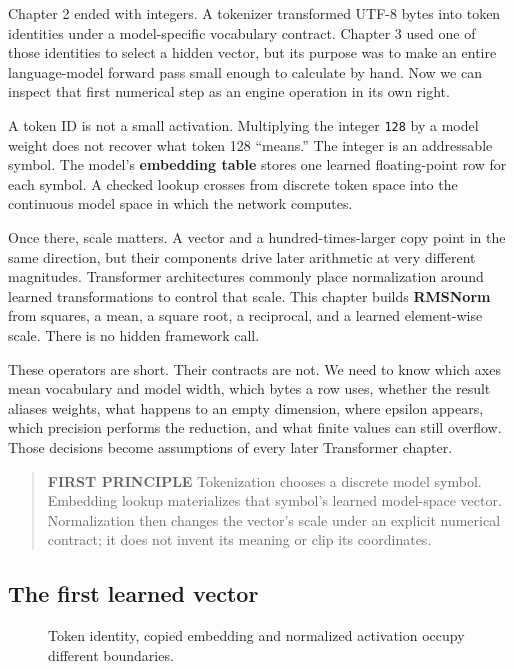 \documentclass[
  10pt,
]{article}
\begin{document}
Chapter 2 ended with integers. A tokenizer transformed UTF-8 bytes into
token identities under a model-specific vocabulary contract. Chapter 3
used one of those identities to select a hidden vector, but its purpose
was to make an entire language-model forward pass small enough to
calculate by hand. Now we can inspect that first numerical step as an
engine operation in its own right.

A token ID is not a small activation. Multiplying the integer
\texttt{128} by a model weight does not recover what token 128
``means.'' The integer is an addressable symbol. The model's
\textbf{embedding table} stores one learned floating-point row for each
symbol. A checked lookup crosses from discrete token space into the
continuous model space in which the network computes.

Once there, scale matters. A vector and a hundred-times-larger copy
point in the same direction, but their components drive later arithmetic
at very different magnitudes. Transformer architectures commonly place
normalization around learned transformations to control that scale. This
chapter builds \textbf{RMSNorm} from squares, a mean, a square root, a
reciprocal, and a learned element-wise scale. There is no hidden
framework call.

These operators are short. Their contracts are not. We need to know
which axes mean vocabulary and model width, which bytes a row uses,
whether the result aliases weights, what happens to an empty dimension,
where epsilon appears, which precision performs the reduction, and what
finite values can still overflow. Those decisions become assumptions of
every later Transformer chapter.

\begin{quote}
\textbf{FIRST PRINCIPLE} Tokenization chooses a discrete model symbol.
Embedding lookup materializes that symbol's learned model-space vector.
Normalization then changes the vector's scale under an explicit
numerical contract; it does not invent its meaning or clip its
coordinates.
\end{quote}

\subsection{The first learned vector}\label{the-first-learned-vector}

\begin{figure}[H]\centering\resizebox{\linewidth}{!}{}\caption{Token identity, copied embedding and normalized activation occupy different boundaries.}\end{figure}
\end{document}
